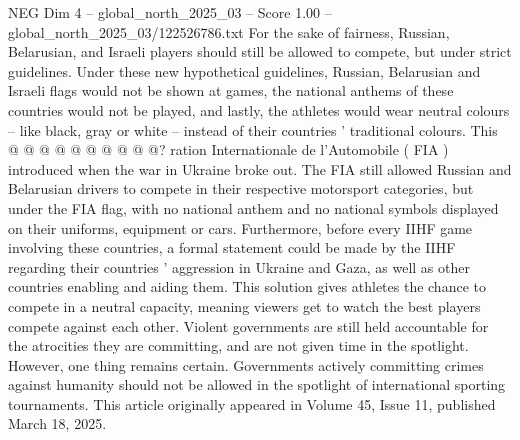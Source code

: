 \begin{textsample}{NEG Dim 4 – global\_north\_2025\_03 – Score 1.00 – global\_north\_2025\_03/122526786.txt}
For the sake of fairness, Russian, Belarusian, and Israeli players should still be allowed to compete, but under strict guidelines.
Under these new hypothetical guidelines, Russian, Belarusian and Israeli flags would not be shown at games, the national anthems of these countries would not be played, and lastly, the athletes would wear neutral colours -- like black, gray or white -- instead of their countries ' traditional colours.
This @ @ @ @ @ @ @ @ @ @? ration Internationale de l'Automobile ( FIA ) introduced when the war in Ukraine broke out.
The FIA still allowed Russian and Belarusian drivers to compete in their respective motorsport categories, but under the FIA flag, with no national anthem and no national symbols displayed on their uniforms, equipment or cars.
Furthermore, before every IIHF game involving these countries, a formal statement could be made by the IIHF regarding their countries ' aggression in Ukraine and Gaza, as well as other countries enabling and aiding them.
This solution gives athletes the chance to compete in a neutral capacity, meaning viewers get to watch the best players compete against each other.
Violent governments are still held accountable for the atrocities they are committing, and are not given time in the spotlight.
However, one thing remains certain.
Governments actively committing crimes against humanity should not be allowed in the spotlight of international sporting tournaments.
This article originally appeared in Volume 45, Issue 11, published March 18, 2025.

\end{textsample}

